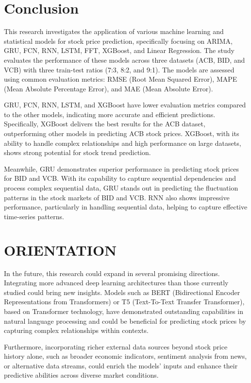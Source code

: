 \documentclass{ieeeojies}
\begin{document}
\section{Conclusion}
This research investigates the application of various machine learning and statistical models for stock price prediction, specifically focusing on ARIMA, GRU, FCN, RNN, LSTM, FFT, XGBoost, and Linear Regression. The study evaluates the performance of these models across three datasets (ACB, BID, and VCB) with three train-test ratios (7:3, 8:2, and 9:1). The models are assessed using common evaluation metrics: RMSE (Root Mean Squared Error), MAPE (Mean Absolute Percentage Error), and MAE (Mean Absolute Error).

GRU, FCN, RNN, LSTM, and XGBoost have lower evaluation metrics compared to the other models, indicating more accurate and efficient predictions. Specifically, XGBoost delivers the best results for the ACB dataset, outperforming other models in predicting ACB stock prices. XGBoost, with its ability to handle complex relationships and high performance on large datasets, shows strong potential for stock trend prediction.

Meanwhile, GRU demonstrates superior performance in predicting stock prices for BID and VCB. With its capability to capture sequential dependencies and process complex sequential data, GRU stands out in predicting the fluctuation patterns in the stock markets of BID and VCB. RNN also shows impressive performance, particularly in handling sequential data, helping to capture effective time-series patterns.
\section{ORIENTATION}
In the future, this research could expand in several promising directions. Integrating more advanced deep learning architectures than those currently studied could bring new insights. Models such as BERT (Bidirectional Encoder Representations from Transformers) or T5 (Text-To-Text Transfer Transformer), based on Transformer technology, have demonstrated outstanding capabilities in natural language processing and could be beneficial for predicting stock prices by capturing complex relationships within contexts.

Furthermore, incorporating richer external data sources beyond stock price history alone, such as broader economic indicators, sentiment analysis from news, or alternative data streams, could enrich the models' inputs and enhance their predictive abilities across diverse market conditions.
\end{document}
